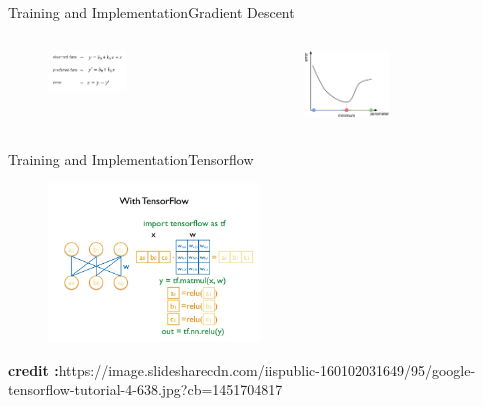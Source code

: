 \documentclass{beamer}
\begin{document}
\begin{frame}{Training and Implementation}{Gradient Descent}

\begin{columns}

\begin{column}[t]{0.48\textwidth}

\begin{figure}[h]
    \centering
    \includegraphics[width=0.5\textwidth]{gd-1.png}
\end{figure}

\end{column}

\begin{column}[t]{0.48\textwidth}

\begin{figure}[h]
    \centering
    \includegraphics[width=0.5\textwidth]{gd-2.png}
\end{figure}
\end{column}

\end{columns}
\end{frame}



\begin{frame}{Training and Implementation}{Tensorflow}
\begin{figure}[h]
    \centering
    \includegraphics[width=0.5\textwidth]{tensorflow.jpg}
\end{figure}
{\tiny \textbf{credit :}https://image.slidesharecdn.com/iispublic-160102031649/95/google-tensorflow-tutorial-4-638.jpg?cb=1451704817 \par}
\end{frame}
\end{document}
